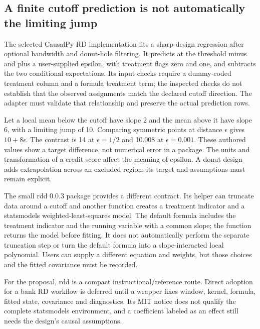 \subsection{A finite cutoff prediction is not automatically the limiting jump}
The selected CausalPy RD implementation fits a sharp-design regression
after optional bandwidth and donut-hole filtering. It predicts at the
threshold minus and plus a user-supplied epsilon, with treatment flags zero
and one, and subtracts the two conditional expectations. Its input checks
require a dummy-coded treatment column and a formula treatment term;
the inspected checks do not establish that the observed assignments match
the declared cutoff direction. The adapter must validate that relationship
and preserve the actual prediction rows.~\citep{exec25_pyrdiv_causalpy}

Let a local mean below the cutoff have slope 2 and the mean above it have
slope 6, with a limiting jump of 10. Comparing symmetric points at distance
$\epsilon$ gives $10+8\epsilon$. The contrast is 14 at $\epsilon=1/2$ and
10.008 at $\epsilon=0.001$. These authored values show a target difference,
not numerical error in a package. The units and transformation of a credit
score affect the meaning of epsilon. A donut design adds extrapolation
across an excluded region; its target and assumptions must remain explicit.
\citep{exec25_pyrdiv_choice}

The small rdd 0.0.3 package provides a different contract. Its helper can
truncate data around a cutoff and another function creates a treatment
indicator and a statsmodels weighted-least-squares model. The default
formula includes the treatment indicator and the running variable with a
common slope; the function returns the model before fitting. It does not
automatically perform the separate truncation step or turn the default
formula into a slope-interacted local polynomial. Users can supply a
different equation and weights, but those choices and the fitted covariance
must be recorded.~\citep{exec25_pyrdiv_rdd}

For the proposal, rdd is a compact instructional/reference route. Direct
adoption for a bank RD workflow is deferred until a wrapper fixes window,
kernel, formula, fitted state, covariance and diagnostics. Its MIT notice
does not qualify the complete statsmodels environment, and a coefficient
labeled as an effect still needs the design's causal assumptions.
\citep{exec25_pyrdiv_rdd,exec25_pyrdiv_choice}

